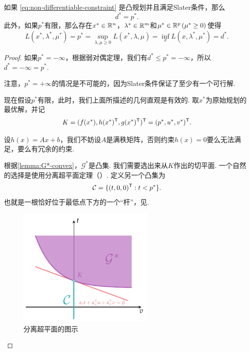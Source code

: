 \begin{theorem}[强对偶定理]\label{thm:strong-duality}
    如果 \eqref{eq:non-differentiable-constraint} 是凸规划并且满足Slater条件，那么
    \[d^*=p^*.\]
    此外，如果$p^*$有限，那么存在$x^*\in\mathbb{R}^n$，$\lambda^*\in\mathbb{R}^m$和$\mu^*\in\mathbb{R}^p\,(\mu^*\geq 0)$使得
    \begin{equation}
        L(x^*,\lambda^*,\mu^*)=p^*=\sup_{\lambda,\mu\geq 0} L(x^*,\lambda,\mu)=\inf_{x} L(x,\lambda^*,\mu^*)=d^*.\label{eq:strong-duality-solution}
    \end{equation}
\end{theorem}
\begin{proof}
    如果$p^*=-\infty$，根据弱对偶定理，我们有$d^*\leq p^*=-\infty$，所以$d^*=-\infty=p^*$.

    注意，$p^*=+\infty$的情况是不可能的，因为Slater条件保证了至少有一个可行解. 
    
    现在假设$p^*$有限，此时，我们上面所描述的几何直观是有效的. 取$x^*$为原始规划的最优解，并记
    \[K=(f(x^*),h(x^*)^{\mathsf{T}},g(x^*)^{\mathsf{T}})^{\mathsf{T}}=(p^*,u^*,v^*)^{\mathsf{T}}.\]

    设$h(x)=Ax+b$，我们不妨设$A$是满秩矩阵，否则约束$h(x)=0$要么无法满足，要么有冗余的约束.

    根据\cref{lemma:G*-convex}，$\mathcal G^*$是凸集. 我们需要选出来从$K$作出的切平面. 一个自然的选择是使用分离超平面定理（）. 定义另一个凸集为
    \[\mathcal{C}=\{(t,0,0)^{\mathsf{T}}: t<p^*\}.\]
    也就是一根恰好位于最低点下方的一个“杆”，见.

    \begin{figure}[ht]
        \centering
        \includegraphics[width=0.6\textwidth]{figures/duality/duality-proof-strong-dual.pdf}
        \caption{分离超平面的图示}
        \label{fig:duality-proof-strong-dual}
    \end{figure}


\end{proof}
